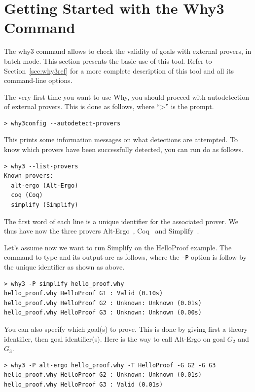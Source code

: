 \section{Getting Started with the Why3 Command}
\label{sec:batch}

The why3 command allows to check the validity of goals with external
provers, in batch mode. This section presents the basic use of this
tool. Refer to Section~\ref{sec:why3ref} for a more complete
description of this tool and all its command-line options.

The very first time you want to use Why, you should proceed with
autodetection of external provers. This is done as follows, where ``>'' is the prompt.
\begin{verbatim}
> why3config --autodetect-provers
\end{verbatim}
This prints some information messages on what detections are attempted. To know which
provers have been successfully detected, you can run do as follows.
\begin{verbatim}
> why3 --list-provers
Known provers:
  alt-ergo (Alt-Ergo)
  coq (Coq)
  simplify (Simplify)
\end{verbatim}
The first word of each line is a unique identifier for the associated prover. We thus
have now the three provers Alt-Ergo~\cite{ergo}, Coq~\cite{CoqArt} and
Simplify~\cite{simplify05}. 

Let's assume now we want to run Simplify on the HelloProof
example. The command to type and its output are as follows, where the
\verb|-P| option is follow by the unique identifier as shown as above.
\begin{verbatim}
> why3 -P simplify hello_proof.why
hello_proof.why HelloProof G1 : Valid (0.10s)
hello_proof.why HelloProof G2 : Unknown: Unknown (0.01s)
hello_proof.why HelloProof G3 : Unknown: Unknown (0.00s)
\end{verbatim}

You can also specify which goal(s) to prove. This is done by giving
first a theory identifier, then goal identifier(s). Here is the way to
call Alt-Ergo on goal $G_2$ and $G_3$.
\begin{verbatim}
> why3 -P alt-ergo hello_proof.why -T HelloProof -G G2 -G G3
hello_proof.why HelloProof G2 : Unknown: Unknown (0.01s)
hello_proof.why HelloProof G3 : Valid (0.01s)
\end{verbatim}


